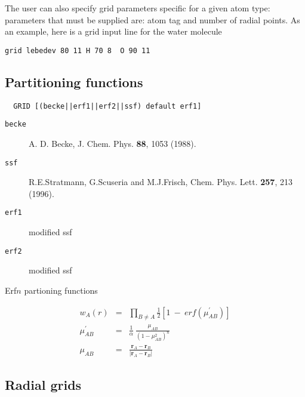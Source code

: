 The user can also specify grid parameters specific for a given atom type: 
parameters that must be supplied are: atom tag and number of radial points.
As an example, here is a grid input line for the water molecule
\begin{verbatim}
grid lebedev 80 11 H 70 8  O 90 11 
\end{verbatim}

%


\clearpage
\subsection{Partitioning functions}

\begin{verbatim}
  GRID [(becke||erf1||erf2||ssf) default erf1]
\end{verbatim}


\begin{description}
\item[\tt becke]  A. D. Becke, J. Chem. Phys. {\bf 88}, 1053 (1988).
\item[\tt ssf] R.E.Stratmann, G.Scuseria and  M.J.Frisch,
Chem. Phys. Lett. {\bf 257}, 213 (1996).
\item[\tt erf1] modified ssf
\item[\tt erf2] modified ssf
\end{description}

Erf$n$ partioning functions

\begin{eqnarray*}
 w_A(r) & = & \prod_{B\neq A}\frac{1}{2} \left[1 \ - \
erf(\mu^\prime_{AB})\right] \\
 \mu^\prime_{AB} & = & \frac{1}{\alpha} \ \frac{\mu_{AB}}{(1-\mu_{AB}^2)^n}\\
 \mu_{AB} & = & \frac{{\mathbf r}_A - {\mathbf r}_B}
{\left|{\mathbf r}_A - {\mathbf r}_B \right|}
\end{eqnarray*}




\subsection{Radial grids}

